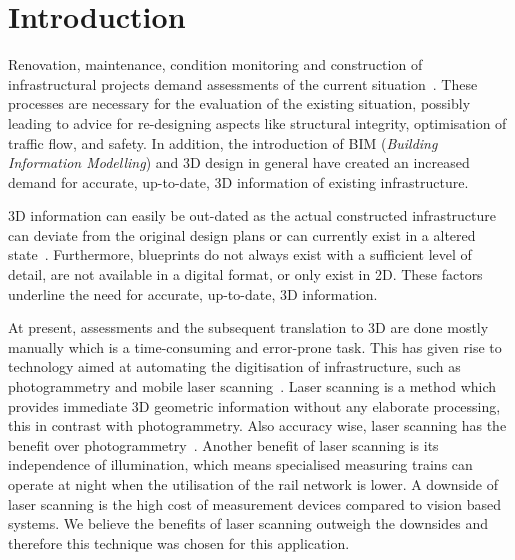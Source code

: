 \section{Introduction}
Renovation, maintenance, condition monitoring and construction of infrastructural projects demand assessments of the current situation~\cite{Uddin2013}.
These processes are necessary for the evaluation of the existing situation, possibly leading to advice for re-designing aspects like structural integrity, optimisation of traffic flow, and safety.
In addition, the introduction of BIM (\emph{Building Information Modelling}) and 3D design in general have created an increased demand for accurate, up-to-date, 3D information of existing infrastructure.

3D information can easily be out-dated as the actual constructed infrastructure can deviate from the original design plans or can currently exist in a altered state~\cite{tang10}. Furthermore, blueprints do not always exist with a sufficient level of detail, are not available in a digital format, or only exist in 2D. These factors underline the need for accurate, up-to-date, 3D information.

At present, assessments and the subsequent translation to 3D are done mostly manually which is a time-consuming and error-prone task.
This has given rise to technology aimed at automating the digitisation of infrastructure, such as photogrammetry and mobile laser scanning~\cite{Baltsavias1999}.
Laser scanning is a method which provides immediate 3D geometric information without any elaborate processing, this in contrast with photogrammetry. Also accuracy wise, laser scanning has the benefit over photogrammetry~\cite{Kalvoda20}. Another benefit of laser scanning is its independence of illumination, which means specialised measuring trains can operate at night when the utilisation of the rail network is lower. A downside of laser scanning is the high cost of measurement devices compared to vision based systems. We believe the benefits of laser scanning outweigh the downsides and therefore this technique was chosen for this application.

